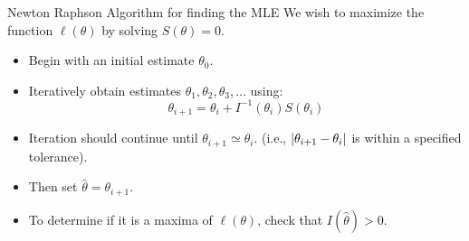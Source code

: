 \documentclass[oneside]{book}\usepackage[]{graphicx}\usepackage[svgnames]{xcolor}
\DeclarePairedDelimiter\abs{\lvert}{\rvert}
\begin{document}
\begin{Regular}{Newton Raphson Algorithm for finding the MLE}
      We wish to maximize the function $ \ell(\theta) $ by solving $ S(\theta)=0 $.
      \begin{itemize}
            \item Begin with an initial estimate $ \theta_0 $.
            \item Iteratively obtain estimates $ \theta_1,\theta_2,\theta_3,\ldots $ using:
                  \[ \theta_{i+1}=\theta_i+I^{-1}(\theta_i)S(\theta_i) \]
            \item Iteration should continue until $ \theta_{i+1}\simeq \theta_i $. (i.e., $ \abs{\theta_{i+1}-\theta_i} $ is within a specified tolerance).
            \item Then set $ \hat{\theta}=\theta_{i+1} $.
            \item To determine if it is a maxima of $ \ell(\theta) $, check that $ I(\hat{\theta})>0 $.
      \end{itemize}
\end{Regular}
\end{document}
